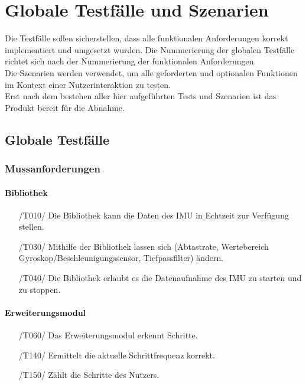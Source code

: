 \documentclass[a4paper,12pt]{article}
\begin{document}
\section{Globale Testfälle und Szenarien}
Die Testfälle sollen sicherstellen, dass alle funktionalen Anforderungen korrekt implementiert und umgesetzt wurden.
Die Nummerierung der globalen Testfälle richtet sich nach der Nummerierung der funktionalen Anforderungen.\\
Die Szenarien werden verwendet, um alle geforderten und optionalen Funktionen im Kontext einer Nutzerinteraktion zu testen.\\
Erst nach dem bestehen aller hier aufgeführten Tests und Szenarien ist das Produkt bereit für die Abnahme.
  \subsection{Globale Testfälle}
  \subsubsection{Mussanforderungen}
  \paragraph{Bibliothek}
  \begin{itemize}
    \item[/T010/] Die Bibliothek kann die Daten des \Gls{IMU} in \Gls{Echtzeit} zur Verfügung stellen.
    \item[/T030/] Mithilfe der Bibliothek lassen sich (Abtastrate, Wertebereich Gyroskop/Beschleunigungssensor, Tiefpassfilter) ändern. 
    \item[/T040/] Die Bibliothek erlaubt es die Datenaufnahme des \Gls{IMU} zu starten und zu stoppen.
  \end{itemize}
  \paragraph{Erweiterungsmodul}
  \begin{itemize}
    \item[/T060/] Das Erweiterungsmodul erkennt Schritte.
    \item[/T140/] Ermittelt die aktuelle \Gls{Schrittfrequenz} korrekt.
    \item[/T150/] Zählt die Schritte des Nutzers.
  \end{itemize}
\end{document}
